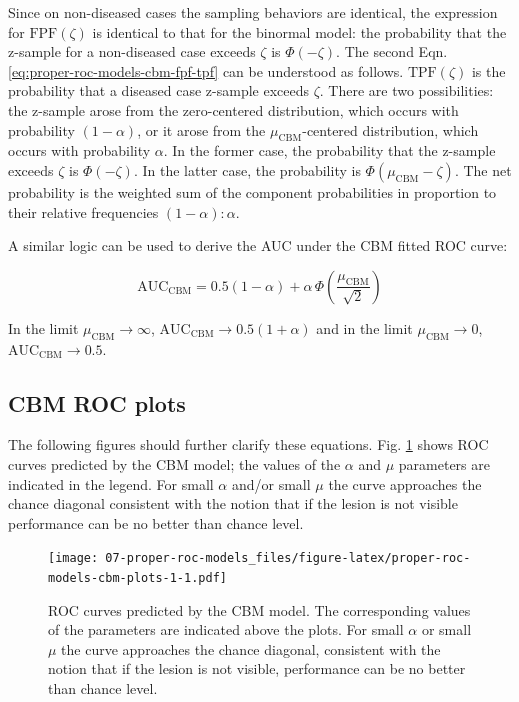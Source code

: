 \documentclass[
]{book}
\begin{document}
Since on non-diseased cases the sampling behaviors are identical, the expression for \(\text{FPF}\left( \zeta \right)\) is identical to that for the binormal model: the probability that the z-sample for a non-diseased case exceeds \(\zeta\) is \(\Phi\left( -\zeta \right)\). The second Eqn. \eqref{eq:proper-roc-models-cbm-fpf-tpf} can be understood as follows. \(\text{TPF}\left( \zeta \right)\) is the probability that a diseased case z-sample exceeds \(\zeta\). There are two possibilities: the z-sample arose from the zero-centered distribution, which occurs with probability \(\left( 1-\alpha \right)\), or it arose from the \(\mu_\text{CBM}\)-centered distribution, which occurs with probability \(\alpha\). In the former case, the probability that the z-sample exceeds \(\zeta\) is \(\Phi\left( -\zeta \right)\). In the latter case, the probability is \(\Phi\left( \mu_\text{CBM}-\zeta \right)\). The net probability is the weighted sum of the component probabilities in proportion to their relative frequencies \(\left( 1-\alpha \right):\alpha\).

A similar logic can be used to derive the AUC under the CBM fitted ROC curve:

\begin{equation}
\text{AUC}_\text{CBM}=0.5\left( 1-\alpha \right)+\alpha \,\Phi\left( \frac {\mu_\text{CBM}}{\sqrt{2}} \right)
\label{eq:proper-roc-models-cbm-auc}
\end{equation}

In the limit \(\mu_\text{CBM} \rightarrow \infty\), \(\text{AUC}_\text{CBM} \rightarrow 0.5\left( 1+\alpha \right)\) and in the limit \(\mu_\text{CBM} \rightarrow 0\), \(\text{AUC}_\text{CBM} \rightarrow 0.5\).

\hypertarget{proper-roc-models-cbm-rocs}{%
\subsection{CBM ROC plots}\label{proper-roc-models-cbm-rocs}}

The following figures should further clarify these equations. Fig. \ref{fig:proper-roc-models-cbm-plots-1} shows ROC curves predicted by the CBM model; the values of the \(\alpha\) and \(\mu\) parameters are indicated in the legend. For small \(\alpha\) and/or small \(\mu\) the curve approaches the chance diagonal consistent with the notion that if the lesion is not visible performance can be no better than chance level.

\begin{figure}
\centering
\texttt{[image: 07-proper-roc-models\_files/figure-latex/proper-roc-models-cbm-plots-1-1.pdf]}
\caption{\label{fig:proper-roc-models-cbm-plots-1}ROC curves predicted by the CBM model. The corresponding values of the parameters are indicated above the plots. For small \(\alpha\) or small \(\mu\) the curve approaches the chance diagonal, consistent with the notion that if the lesion is not visible, performance can be no better than chance level.}
\end{figure}
\end{document}
